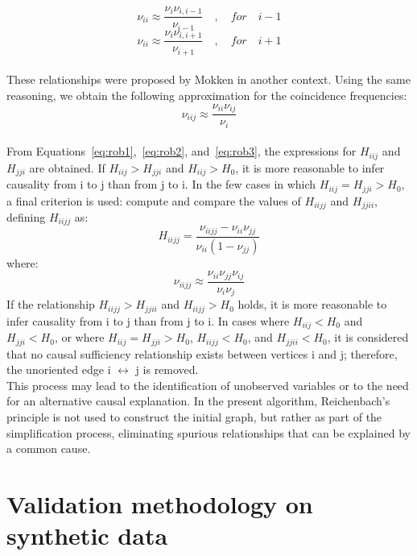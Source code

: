 \documentclass[12pt,a4paper]{report}
\begin{document}
\begin{equation}
\label{eq:rob1}
\nu_{ii} \approx \frac{\nu_{i} \nu_{i,i-1}}{\nu_{i-1}} \quad , \quad for \quad i-1
\end{equation}
\begin{equation}
\label{eq:rob2}
\nu_{ii} \approx \frac{\nu_{i} \nu_{i,i+1}}{\nu_{i+1}} \quad , \quad for \quad i+1
\end{equation}
\\
These relationships were proposed by Mokken in another context\cite{mokken}. Using the same reasoning, we obtain the following approximation for the coincidence frequencies:
\begin{equation}
\label{eq:rob3}
\nu_{iij} \approx \frac{\nu_{ii} \nu_{ij}}{\nu_{i}}
\end{equation} 
\\
From Equations~\ref{eq:rob1},~\ref{eq:rob2}, and~\ref{eq:rob3}, the expressions for $H_{iij}$ and $H_{jji}$ are obtained. If $H_{iij} > H_{jji}$ and $H_{iij} > H_0$, it is more reasonable to infer causality from i to j than from j to i. In the few cases in which $H_{iij} = H_{jji} > H_0$, a final criterion is used: compute and compare the values of $H_{iijj}$ and $H_{jjii}$, defining $H_{iijj}$ as:
\begin{equation}
H_{iijj} = \frac{\nu_{iijj} - \nu_{ii} \nu_{jj}}{\nu_{ii} (1 - \nu_{jj})}
\end{equation}
where:
\begin{equation}
\nu_{iijj} \approx \frac{\nu_{ii} \nu_{jj} \nu_{ij}}{\nu_{i} \nu_{j}}
\end{equation}
If the relationship $H_{iijj} > H_{jjii}$ and $H_{iijj} > H_0$ holds, it is more reasonable to infer causality from i to j than from j to i. In cases where $H_{iij} < H_0$ and $H_{jji} < H_0$, or where $H_{iij} = H_{jji} > H_0$, $H_{iijj} < H_0$, and $H_{jjii} < H_0$, it is considered that no causal sufficiency relationship exists between vertices i and j; therefore, the unoriented edge i $\leftrightarrow$ j is removed.
\\

	This process may lead to the identification of unobserved variables or to the need for an alternative causal explanation. In the present algorithm, Reichenbach's principle is not used to construct the initial graph, but rather as part of the simplification process, eliminating spurious relationships that can be explained by a common cause.



\section{Validation methodology on synthetic data}
\label{sec:2.3}
\end{document}
